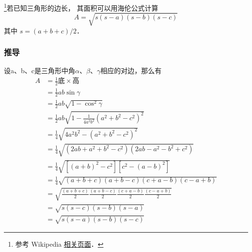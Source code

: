 
\footnote{参考 Wikipedia \href{https://en.wikipedia.org/wiki/Heron's_formula}{相关页面}．}若已知三角形的边长， 其面积可以用海伦公式计算
\begin{equation}
A = \sqrt{s(s-a)(s-b)(s-c)}
\end{equation}
其中 $s = (a+b+c)/2$．
\subsubsection{推导}
设a、b、c是三角形中角$\alpha$、$\beta$、$\gamma$相应的对边，那么有
\begin{equation}
\begin{aligned}
A&=\frac{1}{2}\text{底}\times\text{高}\\
&=\frac{1}{2}ab\sin\gamma\\
&=\frac{1}{2}ab\sqrt{1-\cos^2\gamma}\\
&=\frac{1}{2}ab\sqrt{1-\frac{1}{4a^2b^2}(a^2+b^2-c^2)^2}\\
&=\frac{1}{4}\sqrt{4a^2b^2-(a^2+b^2-c^2)^2}\\
&=\frac{1}{4}\sqrt{(2ab+a^2+b^2-c^2)(2ab-a^2-b^2+c^2)}\\
&=\frac{1}{4}\sqrt{[(a+b)^2-c^2][c^2-(a-b)^2]}\\
&=\frac{1}{4}\sqrt{(a+b+c)(a+b-c)(c+a-b)(c-a+b)}\\
&=\sqrt{\frac{(a+b+c)}{2}\frac{(a+b-c)}{2}\frac{(c+a-b)}{2}\frac{(c-a+b)}{2}}\\
&=\sqrt{s(s-c)(s-b)(s-a)}\\
&=\sqrt{s(s-a)(s-b)(s-c)}
\end{aligned}
\end{equation}
